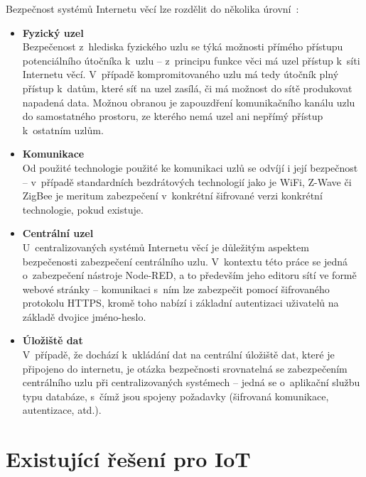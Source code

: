 Bezpečnost systémů Internetu věcí lze rozdělit do několika úrovní~\cite{IoTSecurity}:
\begin{itemize}
    \item \textbf{Fyzický uzel} \\
    Bezpečenost z~hlediska fyzického uzlu se týká možnosti přímého přístupu potenciálního útočníka k~uzlu --
z~principu funkce věci má uzel přístup k~síti Internetu věcí.
    V~případě kompromitovaného uzlu má tedy útočník plný přístup k~datům, které síť na uzel zasílá, či má možnost do
    sítě produkovat napadená data.
    Možnou obranou je zapouzdření komunikačního kanálu uzlu do samostatného prostoru, ze kterého nemá uzel ani nepřímý
    přístup k~ostatním uzlům.

    \item \textbf{Komunikace} \\
    Od použité technologie použité ke komunikaci uzlů se odvíjí i její bezpečnost -- v~případě standardních
    bezdrátových technologií jako je WiFi, Z-Wave či ZigBee je meritum zabezpečení v~konkrétní šifrované verzi
    konkrétní technologie, pokud existuje.

    \item \textbf{Centrální uzel} \\
    U~centralizovaných systémů Internetu věcí je důležitým aspektem bezpečenosti zabezpečení centrálního uzlu.
    V~kontextu této práce se jedná o~zabezpečení nástroje Node-RED, a to především jeho editoru
    sítí ve formě webové stránky -- komunikaci s~ním lze zabezpečit pomocí šifrovaného protokolu HTTPS, kromě toho
    nabízí i základní autentizaci uživatelů na základě dvojice jméno-heslo.

    \item \textbf{Úložiště dat} \\
    V~případě, že dochází k~ukládání dat na centrální úložiště dat, které je připojeno do internetu, je otázka
    bezpečnosti srovnatelná se zabezpečením centrálního uzlu při centralizovaných systémech -- jedná se o~aplikační
    službu typu databáze, s~čímž jsou spojeny požadavky (šifrovaná komunikace, autentizace, atd.).
\end{itemize}


\section{Existující řešení pro IoT}\label{sec:existujici-reseni}

